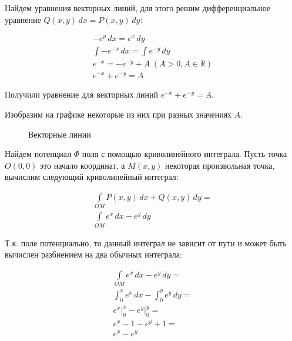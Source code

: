\bigskip

Найдем уравнения векторных линий, для этого решим дифференциальное уравнение
\(Q(x, y)\,dx = P(x, y)\,dy\):

\begin{equation*}\begin{split}
    -e^y\,dx = e^x\,dy \\
    \int -e^{-x}\,dx = \int e^{-y}\,dy \\
    e^{-x} = -e^{-y} + A \hspace{3pt} (A > 0, A \in \mathbb{R})\\
    e^{-x} + e^{-y} = A
  \end{split}\end{equation*}

Получили уравнение для векторных линий \(e^{-x} + e^{-y} = A\).

Изобразим на графике некоторые из них при разных значениях \(A\).

\begin{figure}[!htbp]
  \centering
  \caption{Векторные линии}
\end{figure}

\bigskip

Найдем потенциал \(\Phi\) поля с помощью криволинейного интеграла. Пусть точка
\(O(0, 0)\) это начало координат, а \(M(x, y)\) некоторая произвольная точка,
вычислим следующий криволинейный интеграл:

\begin{equation*}\begin{split}
    \int\limits_{OM} P(x, y)\,dx + Q(x, y)\,dy = \\
    \int\limits_{OM} e^x \,dx - e^y \,dy
  \end{split}\end{equation*}

Т.к. поле потенциально, то данный интеграл не зависит от пути и может быть
вычислен разбиением на два обычных интеграла:

\begin{equation*}\begin{split}
    \int\limits_{OM} e^x \,dx - e^y \,dy = \\
    \int_0^x e^x\,dx - \int_0^y e^y\,dy = \\
    e^x \bigg\vert_0^x - e^y \bigg\vert_0^y = \\
    e^x - 1 - e^y + 1 = \\
    e^x - e^y
  \end{split}\end{equation*}

